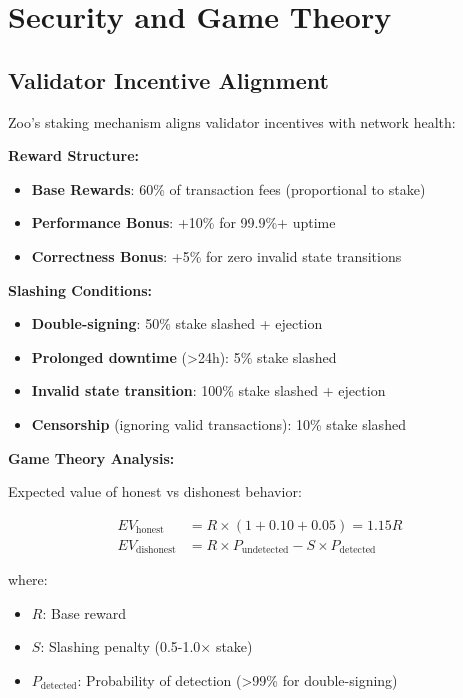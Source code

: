 \documentclass[11pt,letterpaper]{article}
\theoremstyle{definition}
\theoremstyle{remark}
\begin{document}
\section{Security and Game Theory}

\subsection{Validator Incentive Alignment}

Zoo's staking mechanism aligns validator incentives with network health:

\textbf{Reward Structure:}
\begin{itemize}
\item \textbf{Base Rewards}: 60\% of transaction fees (proportional to stake)
\item \textbf{Performance Bonus}: +10\% for 99.9\%+ uptime
\item \textbf{Correctness Bonus}: +5\% for zero invalid state transitions
\end{itemize}

\textbf{Slashing Conditions:}
\begin{itemize}
\item \textbf{Double-signing}: 50\% stake slashed + ejection
\item \textbf{Prolonged downtime} (>24h): 5\% stake slashed
\item \textbf{Invalid state transition}: 100\% stake slashed + ejection
\item \textbf{Censorship} (ignoring valid transactions): 10\% stake slashed
\end{itemize}

\textbf{Game Theory Analysis:}

Expected value of honest vs dishonest behavior:

\begin{align}
EV_{\text{honest}} &= R \times (1 + 0.10 + 0.05) = 1.15R \\
EV_{\text{dishonest}} &= R \times P_{\text{undetected}} - S \times P_{\text{detected}}
\end{align}

where:
\begin{itemize}
\item $R$: Base reward
\item $S$: Slashing penalty (0.5-1.0× stake)
\item $P_{\text{detected}}$: Probability of detection (>99\% for double-signing)
\end{itemize}
\end{document}
